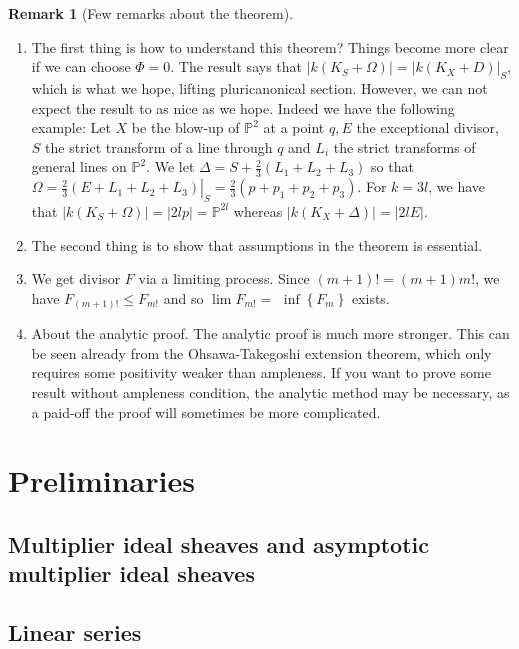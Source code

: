 \documentclass[11pt]{article}
\theoremstyle{definition}
\newtheorem{remark}[theorem]{Remark}
\begin{document}
	\begin{remark}[Few remarks about the theorem]~\\
		\begin{enumerate}
			\item The first thing is how to understand this theorem? Things become more clear if we can choose $\Phi = 0$. The result says that $|k(K_S+\Omega)| = |k(K_X+D)|_S$, which is what we hope, lifting pluricanonical section. However, we can not expect the result to as nice as we hope. Indeed we have the following example: Let $X$ be the blow-up of $\mathbb{P}^2$ at a point $q, E$ the exceptional divisor, $S$ the strict transform of a line through $q$ and $L_i$ the strict transforms of general lines on $\mathbb{P}^2$. We let $\Delta=S+\frac{2}{3}\left(L_1+L_2+L_3\right)$ so that $\Omega=\left.\frac{2}{3}\left(E+L_1+L_2+L_3\right)\right|_S=\frac{2}{3}\left(p+p_1+p_2+p_3\right)$. For $k=3 l$, we have that $\left|k\left(K_S+\Omega\right)\right|=|2 l p|=\mathbb{P}^{2 l}$ whereas $\left|k\left(K_X+\Delta\right)\right|=|2 l E|$.
			\item The second thing is to show that assumptions in the theorem is essential. 
			\item We get divisor $F$ via a limiting process. Since $(m+1)!=(m+1) m!$, we have $F_{(m+1)!} \leq F_{m!}$ and so $\lim F_{m!}=$ $\inf \left\{F_m\right\}$ exists.
			\item About the analytic proof. The analytic proof is much more stronger. This can be seen already from the Ohsawa-Takegoshi extension theorem, which only requires some positivity weaker than ampleness. If you want to prove some result without ampleness condition, the analytic method may be necessary, as a paid-off the proof will sometimes be more complicated.
		\end{enumerate}
	\end{remark}
	\section{Preliminaries}
	
	
	\subsection{Multiplier ideal sheaves and asymptotic multiplier ideal sheaves}
	

	\subsection{Linear series}
	
\end{document}
